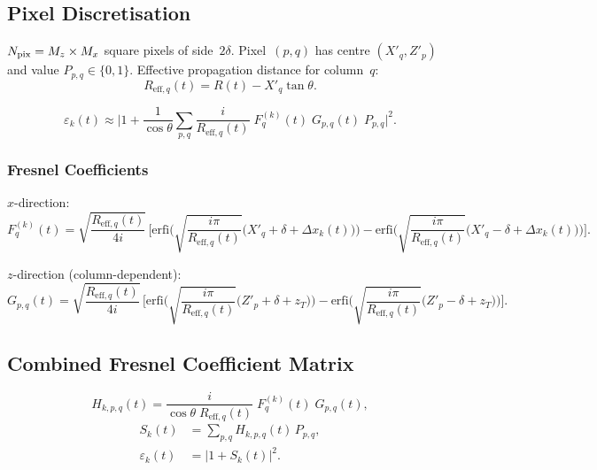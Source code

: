 \documentclass[11pt,a4paper]{article}
\newcommand{\erfi}{\mathrm{erfi}}
\begin{document}
\subsection{Pixel Discretisation}

$N_{\rm pix}=M_z\times M_x$ square pixels of side~$2\delta$.
Pixel~$(p,q)$ has centre $(X'_q,Z'_p)$ and value
$P_{p,q}\in\{0,1\}$.  Effective propagation distance for column~$q$:
\begin{equation}
  R_{\mathrm{eff},q}(t) = R(t) - X'_q\tan\theta.
  \label{eq:R_eff_q}
\end{equation}

\begin{equation}
  \varepsilon_k(t) \approx \biggl|1
  + \frac{1}{\cos\theta}\sum_{p,q}
  \frac{i}{R_{\mathrm{eff},q}(t)}\;
  F_q^{(k)}(t)\;G_{p,q}(t)\;P_{p,q}\biggr|^2.
  \label{eq:fssr_pixel}
\end{equation}

\subsubsection{Fresnel Coefficients}

$x$-direction:
\begin{equation}
  F_q^{(k)}(t)
  = \sqrt{\frac{R_{\mathrm{eff},q}(t)}{4i}}\,\biggl[
    \erfi\!\biggl(\sqrt{\frac{i\pi}{R_{\mathrm{eff},q}(t)}}
    \bigl(X'_q{+}\delta{+}\Delta x_k(t)\bigr)\biggr)
  - \erfi\!\biggl(\sqrt{\frac{i\pi}{R_{\mathrm{eff},q}(t)}}
    \bigl(X'_q{-}\delta{+}\Delta x_k(t)\bigr)\biggr)\biggr].
  \label{eq:Fq}
\end{equation}

$z$-direction (column-dependent):
\begin{equation}
  G_{p,q}(t)
  = \sqrt{\frac{R_{\mathrm{eff},q}(t)}{4i}}\,\biggl[
    \erfi\!\biggl(\sqrt{\frac{i\pi}{R_{\mathrm{eff},q}(t)}}
    \bigl(Z'_p{+}\delta{+}z_T\bigr)\biggr)
  - \erfi\!\biggl(\sqrt{\frac{i\pi}{R_{\mathrm{eff},q}(t)}}
    \bigl(Z'_p{-}\delta{+}z_T\bigr)\biggr)\biggr].
  \label{eq:Gpq}
\end{equation}

\subsection{Combined Fresnel Coefficient Matrix}

\begin{equation}
  H_{k,p,q}(t) = \frac{i}{\cos\theta\;R_{\mathrm{eff},q}(t)}\;
  F_q^{(k)}(t)\;G_{p,q}(t),
  \label{eq:H_matrix}
\end{equation}
\begin{align}
  S_k(t) &= \sum_{p,q} H_{k,p,q}(t)\,P_{p,q},
  \label{eq:Sk}\\
  \varepsilon_k(t) &= |1 + S_k(t)|^2. \label{eq:eps_from_S}
\end{align}
\end{document}
